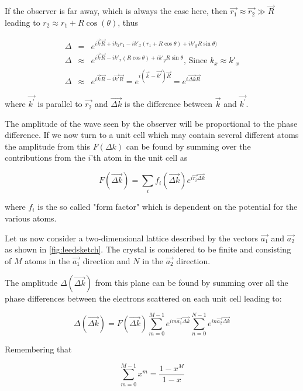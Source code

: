 If the observer is far away, which is always the case here, then $\vec{r_1}\approx\vec{r_2}\gg \vec{R}$ leading to $r_2\approx r_1+R\cos(\theta)$, thus

\begin{eqnarray}
\Delta	& =		& e^{i\vec{k}\vec{R}+ik_xr_1-ik'_x(r_1+R\cos\theta)+ik'_yR\sin\theta)}\\ 
\Delta	& \approx	& e^{i\vec{k}\vec{R}-ik'_x(R\cos\theta)+ik'_yR\sin\theta} \mbox{, Since } k_x\approx k'_x\\
\Delta	& \approx	& e^{i\vec{k}\vec{R}-i\vec{k'}\vec{R}}=e^{i(\vec{k}-\vec{k'})\vec{R}}=e^{i\vec{\Delta k}\vec{R}}
\end{eqnarray}

\noindent where $\vec{k^\prime}$ is parallel to $\vec{r_2}$ and  $\vec{\Delta k}$ is the difference between $\vec{k}$ and $\vec{k^\prime}$.

The amplitude of the wave seen by the observer will be  proportional to the phase difference. If we now turn to a unit cell which may contain several different atoms the amplitude from this  $F(\Delta k)$ can be found by summing over the contributions from the $i$'th atom in the unit cell as

\begin{equation}
F(\vec{\Delta k})=\sum_i f_i(\vec{\Delta k})e^{i\vec{r_i}\vec{\Delta k}}
\end{equation}

\noindent where $f_i$ is the so called "form factor" which is dependent on the potential for the various atoms.

Let us now consider a two-dimensional lattice described by the vectors $\vec{a_1}$ and $\vec{a_2}$ as shown in \autoref{fig:leedsketch}. The crystal is considered to be finite and consisting of $M$ atoms in the $\vec{a_1}$ direction and $N$ in the $\vec{a_2}$ direction.

The amplitude $\Delta(\vec{\Delta k})$ from this plane can be found by summing over all the phase differences between the electrons scattered on each unit cell leading to:

\begin{equation}
\Delta(\vec{\Delta k})=F(\vec{\Delta k})\sum_{m=0}^{M-1}e^{im\vec{a_1}\vec{\Delta k}}\sum_{n=0}^{N-1}e^{in\vec{a_2}\vec{\Delta k}}
\end{equation}

Remembering that

\begin{equation}
\sum_{m=0}^{M-1}x^m=\frac{1-x^M}{1-x}
\end{equation}

